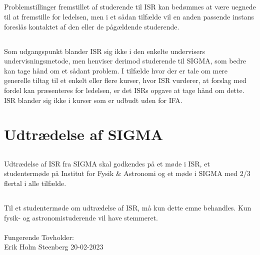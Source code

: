 \documentclass[danish,a4paper,twocolumn]{article}
\begin{document}
\subsection{}
Problemstillinger fremstillet af studerende til ISR kan bedømmes at være uegnede til at fremstille for ledelsen, men i et sådan tilfælde vil en anden
passende instans foreslås kontaktet af den eller de pågældende studerende.
\subsection{}
Som udgangspunkt blander ISR sig ikke i den enkelte undervisers undervisningsmetode, men henviser derimod studerende til SIGMA, som bedre kan tage hånd om et sådant problem. I tilfælde hvor der er tale om mere generelle tiltag til et enkelt eller  flere kurser, hvor ISR vurderer, at forslag med fordel kan præsenteres for ledelsen, er det ISRs opgave at tage hånd om dette. ISR blander sig ikke i kurser som er udbudt uden for IFA.

\section{Udtrædelse af SIGMA}

\subsection{}
Udtrædelse af ISR fra SIGMA skal godkendes på et møde i ISR, et studentermøde på Institut for Fysik & Astronomi og et møde i SIGMA med 2/3 flertal i alle tilfælde.
\subsection{}
Til et studentermøde om udtrædelse af ISR, må kun dette emne behandles. Kun fysik- og astronomistuderende vil have stemmeret.
\\
\\
Fungerende Tovholder:\\ Erik Holm Steenberg 20-02-2023
\end{document}
